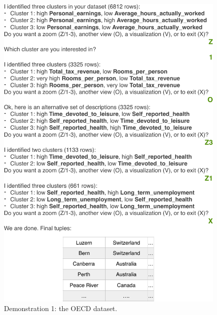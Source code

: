 \begin{figure}[t]
  \centering
  \includegraphics[width=\columnwidth]{Experiments/UseCaseFull}
  \caption{Demonstration 1: the OECD dataset.}
  \label{fig:UseCase1}
\end{figure}

